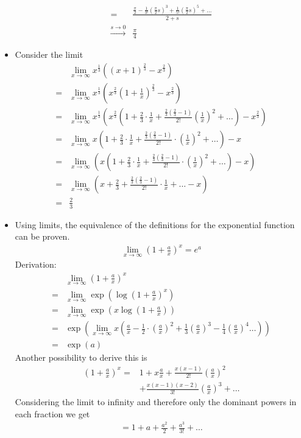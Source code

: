 \begin{ex}
\begin{itemize}
\begin{align*}
= & \frac{\frac \pi 2 - \frac 1 {3!} \left( \frac \pi 2 s \right)^3 + \frac 1 {5!} \left( \frac \pi 2 s \right)^5 + \dots}{2+s} \\
 \overset{s \to 0}{\to} & \frac \pi 4 
\end{align*}
\item
Consider the limit
\begin{align*}
& \lim_{x\to \infty} x^{\frac 1 3} \left( (x+1)^{\frac 2 3} - x^{\frac 2 3} \right) \\
= & \lim_{x\to \infty} x^{\frac 1 3} \left( x^{\frac 2 3} (1+ \frac 1 x)^{\frac 2 3} - x^{\frac 2 3} \right) \\
= & \lim_{x\to \infty} x^{\frac 1 3} \left( x^{\frac 2 3} \left( 1+ \frac 2 3 \cdot \frac 1 x + \frac{\frac 2 3 \left( \frac 2 3 -1 \right)}{2!} \left( \frac{1}{x} \right)^2 + \dots \right) - x^{\frac 2 3} \right) \\
= & \lim_{x\to \infty} x \left( 1+ \frac 2 3 \cdot \frac 1 x + \frac{\frac 2 3 \left( \frac 2 3 -1 \right)}{2!} \cdot \left( \frac{1}{x} \right)^2 + \dots \right) - x \\
= & \lim_{x\to \infty} \left( x \left( 1+ \frac 2 3 \cdot \frac 1 x + \frac{\frac 2 3 \left( \frac 2 3 -1 \right)}{2!} \cdot \left( \frac{1}{x} \right)^2 + \dots \right) - x \right) \\
= & \lim_{x\to \infty} \left( x + \frac 2 3 + \frac{\frac 2 3 \left( \frac 2 3 -1 \right)}{2!} \cdot \frac{1}{x} + \dots  - x \right) \\
= & \frac 2 3
\end{align*}
\item 
Using limits, the equivalence of the definitions for the exponential function can be proven.
\begin{align*}
\lim_{x \to \infty} \left(1+ \frac a x \right)^x = e^a
\end{align*} 
Derivation:
\begin{align*}
& \lim_{x \to \infty} \left( 1+\frac a x \right)^x \\
= & \lim_{x \to \infty} \exp \left( \log \left( 1+ \frac a x \right)^x \right) \\
= & \lim_{x \to \infty} \exp \left(x \log \left( 1+ \frac a x \right) \right) \\
= & \exp \left( \lim_{x \to \infty} x \left( \frac a x- \frac 1 2 \cdot \left( \frac a x \right)^2 + \frac 1 3  \left(\frac a x \right)^3 - \frac 1 4  \left( \frac a x \right)^4 \dots \right) \right) \\
= & \exp (a)
\end{align*}
Another possibility to derive this is
\begin{align*}
\left( 1+\frac a x \right)^x
= & 1+ x \frac a x + \frac{x(x-1)}{2!} \left( \frac a x \right) ^2 \\
& + \frac{x(x-1)(x-2)}{3!} \left( \frac a x \right)^3 + \dots 
\end{align*}
Considering the limit to infinity and therefore only the dominant powers in each fraction we get
\begin{align*}
= 1+a+ \frac {a^2}{2}  +\frac{a^3}{3!} +\dots 
\end{align*}
\end{itemize}
\end{ex}
